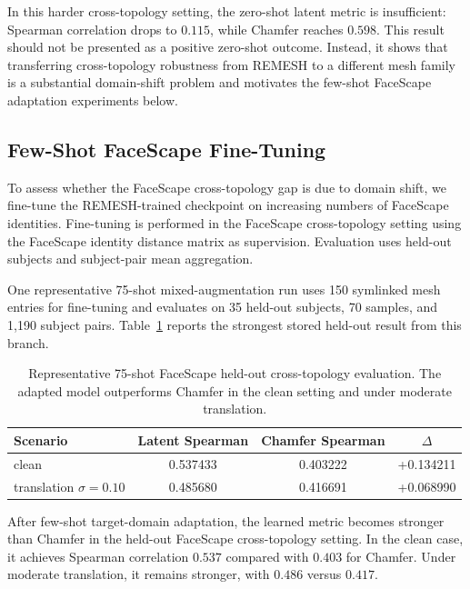 \documentclass[10pt,twocolumn,letterpaper]{article}
\begin{document}
In this harder cross-topology setting, the zero-shot latent metric is
insufficient: Spearman correlation drops to $0.115$, while Chamfer reaches
$0.598$. This result should not be presented as a positive zero-shot outcome.
Instead, it shows that transferring cross-topology robustness from REMESH to a
different mesh family is a substantial domain-shift problem and motivates the
few-shot FaceScape adaptation experiments below.

\subsection{Few-Shot FaceScape Fine-Tuning}
\label{app:faceverse_finetuning}

To assess whether the FaceScape cross-topology gap is due to domain shift, we
fine-tune the REMESH-trained checkpoint on increasing numbers of FaceScape
identities. Fine-tuning is performed in the FaceScape cross-topology setting
using the FaceScape identity distance matrix as supervision. Evaluation uses
held-out subjects and subject-pair mean aggregation.

One representative 75-shot mixed-augmentation run uses 150 symlinked mesh
entries for fine-tuning and evaluates on 35 held-out subjects, 70 samples, and
1,190 subject pairs. Table~\ref{tab:faceverse_75shot_app} reports the strongest
stored held-out result from this branch.

\begin{table}[h]
\centering
\small
\caption{
Representative 75-shot FaceScape held-out cross-topology evaluation. The adapted
model outperforms Chamfer in the clean setting and under moderate translation.
}
\label{tab:faceverse_75shot_app}
\begin{tabular}{lccc}
\toprule
Scenario & Latent Spearman & Chamfer Spearman & $\Delta$ \\
\midrule
clean & 0.537433 & 0.403222 & +0.134211 \\
translation $\sigma=0.10$ & 0.485680 & 0.416691 & +0.068990 \\
\bottomrule
\end{tabular}
\end{table}

After few-shot target-domain adaptation, the learned metric becomes stronger than
Chamfer in the held-out FaceScape cross-topology setting. In the clean case, it
achieves Spearman correlation $0.537$ compared with $0.403$ for Chamfer. Under
moderate translation, it remains stronger, with $0.486$ versus $0.417$.
\end{document}
